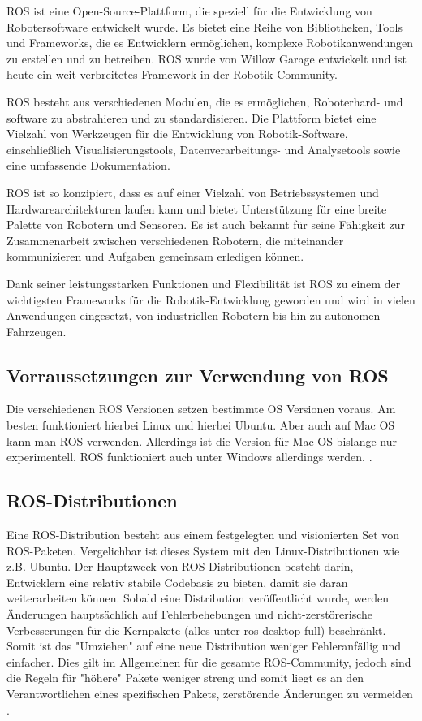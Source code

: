 \ac{ROS} ist eine Open-Source-Plattform, die speziell für die Entwicklung von Robotersoftware entwickelt wurde. Es bietet eine Reihe von Bibliotheken, Tools und Frameworks, die es Entwicklern ermöglichen, komplexe Robotikanwendungen zu erstellen und zu betreiben. \ac{ROS} wurde von Willow Garage entwickelt und ist heute ein weit verbreitetes Framework in der Robotik-Community.

\ac{ROS} besteht aus verschiedenen Modulen, die es ermöglichen, Roboterhard-  und software zu abstrahieren und zu standardisieren. Die Plattform bietet eine Vielzahl von Werkzeugen für die Entwicklung von Robotik-Software, einschließlich Visualisierungstools, Datenverarbeitungs- und Analysetools sowie eine umfassende Dokumentation.

\ac{ROS} ist so konzipiert, dass es auf einer Vielzahl von Betriebssystemen und Hardwarearchitekturen laufen kann und bietet Unterstützung für eine breite Palette von Robotern und Sensoren. Es ist auch bekannt für seine Fähigkeit zur Zusammenarbeit zwischen verschiedenen Robotern, die miteinander kommunizieren und Aufgaben gemeinsam erledigen können.

Dank seiner leistungsstarken Funktionen und Flexibilität ist \ac{ROS} zu einem der wichtigsten Frameworks für die Robotik-Entwicklung geworden und wird in vielen Anwendungen eingesetzt, von industriellen Robotern bis hin zu autonomen Fahrzeugen.

    \subsection{Vorraussetzungen zur Verwendung von ROS} \label{Vorraussetzungen zur Verwendung von ROS:subsection}
    Die verschiedenen \ac{ROS} Versionen setzen bestimmte \ac{OS} Versionen voraus. Am besten funktioniert hierbei Linux und hierbei Ubuntu. Aber auch auf Mac OS kann man ROS verwenden. Allerdings ist die Version für Mac OS bislange nur experimentell. \ac{ROS} funktioniert auch unter Windows allerdings werden. \cite[vgl.][]{ROSIntroduction}.

    \subsection{ROS-Distributionen} \label{ROS-Distributionen:subsection}
    Eine ROS-Distribution besteht aus einem festgelegten und visionierten Set von ROS-Paketen. Vergelichbar ist dieses System mit den Linux-Distributionen wie z.B. Ubuntu. Der Hauptzweck von ROS-Distributionen besteht darin, Entwicklern eine relativ stabile Codebasis zu bieten, damit sie daran weiterarbeiten können. Sobald eine Distribution veröffentlicht wurde, werden Änderungen hauptsächlich auf Fehlerbehebungen und nicht-zerstörerische Verbesserungen für die Kernpakete (alles unter ros-desktop-full) beschränkt. Somit ist das "Umziehen" auf eine neue Distribution weniger Fehleranfällig und einfacher. Dies gilt im Allgemeinen für die gesamte ROS-Community, jedoch sind die Regeln für "höhere" Pakete weniger streng und somit liegt es an den Verantwortlichen eines spezifischen Pakets, zerstörende Änderungen zu vermeiden \cite[vgl.][]{ROScontributions}.

